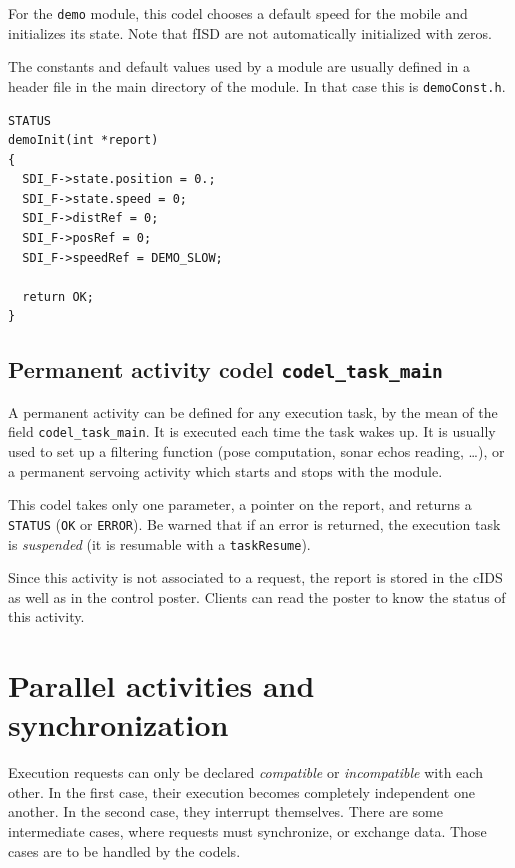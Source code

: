 For the \texttt{demo} module,  this codel chooses  a  default speed for  the
mobile  and initializes its state.   Note  that fISD are not automatically
initialized with zeros.

The constants and default values used by a  module are usually defined in
a header file in the main directory  of the module. In  that case this is
\texttt{demoConst.h}.

\begin{center}\begin{cartouche}\small\begin{verbatim}
STATUS
demoInit(int *report)
{
  SDI_F->state.position = 0.;
  SDI_F->state.speed = 0;
  SDI_F->distRef = 0;
  SDI_F->posRef = 0;
  SDI_F->speedRef = DEMO_SLOW;

  return OK;
}
\end{verbatim}\end{cartouche}\end{center}


\subsection{Permanent activity codel \texttt{codel\_task\_main}}

A permanent activity can  be defined for  any execution task, by the mean
of the  field  \texttt{codel\_task\_main}.  It is executed  each  
time the task  wakes up. 
It is usually used to set up a  filtering function (pose computation,
sonar echos  reading, \ldots), or   a permanent  servoing activity  which
starts and stops with the module.

This codel takes only one parameter, a pointer on the report, and returns
a \texttt{STATUS} (\texttt{OK} or \texttt{ERROR}).  Be warned that  if an error is
returned, the execution task  is \emph{suspended} (it  is resumable with a
\texttt{taskResume}).

Since this activity is not associated to a  request, the report is stored
in the cIDS as well as in the control poster. Clients can read the poster
to know the status of this activity.


\section{Parallel activities and synchronization}

Execution   requests can  only  be  declared  \emph{compatible} or  {\em
incompatible} with each other. In the first case, their execution becomes
completely  independent one another.  In  the second case, they interrupt
themselves.  There are  some   intermediate  cases, where  requests  must
synchronize, or exchange  data.   Those cases are  to  be handled  by the
codels.

